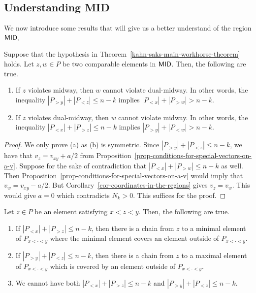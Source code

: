 \documentclass{puthesis-UG}
\begin{document}
\subsection{Understanding MID}

We now introduce some results that will give us a better understand of the region $\mathsf{MID}$.

\begin{lem} \label{lem-simultaneously-violate-mid-and-dual-mid}
	Suppose that the hypothesis in Theorem~\ref{kahn-saks-main-workhorse-theorem} holds. Let $z, w \in P$ be two comparable elements in $\mathsf{MID}$. Then, the following are true. 
	\begin{enumerate}[label = (\alph*)]
		\item If $z$ violates midway, then $w$ cannot violate dual-midway. In other words, the inequality $|P_{> y}| + |P_{< z}| \leq n-k$ implies $|P_{<x}| + |P_{>w}| > n-k$. 
		\item If $z$ violates dual-midway, then $w$ cannot violate midway. In other words, the inequality $|P_{< x}| + |P_{> z}| \leq n-k$ implies $|P_{> y}| + |P_{< w}| > n-k$. 
	\end{enumerate}
\end{lem}

\begin{proof}
	We only prove (a) as (b) is symmetric. Since $|P_{> y}| + |P_{< z}| \leq n-k$, we have that $v_z = v_{xy} + a/2$ from Proposition~\ref{prop-conditions-for-special-vectors-on-a-v}. Suppose for the sake of contradiction that $|P_{< x}| + |P_{> w}| \leq n-k$ as well. Then Proposition~\ref{prop-conditions-for-special-vectors-on-a-v} would imply that $v_w = v_{xy} - a/2$. But Corollary~\ref{cor-coordinates-in-the-regions} gives $v_z = v_w$. This would give $a = 0$ which contradicts $N_k > 0$. This suffices for the proof. 
\end{proof}

\begin{prop} \label{prop-connective-alan-kahn-saks}
	Let $z \in P$ be an element satisfying $x < z < y$. Then, the following are true. 
	\begin{enumerate}[label = (\alph*)]
		\item If $|P_{< x}| + |P_{> z}| \leq n-k$, then there is a chain from $z$ to a minimal element of $P_{x < \cdot < y}$ where the minimal element covers an element outside of $P_{x < \cdot < y}$. 
		\item If $|P_{> y}| + |P_{< z}| \leq n-k$, then there is a chain from $z$ to a maximal element of $P_{x < \cdot < y}$ which is covered by an element outside of $P_{x < \cdot < y}$. 
		\item We cannot have both $|P_{< x}| + |P_{> z}| \leq n-k$ and $|P_{> y}| + |P_{< z}| \leq n-k$.  
	\end{enumerate}
\end{prop}
\end{document}
